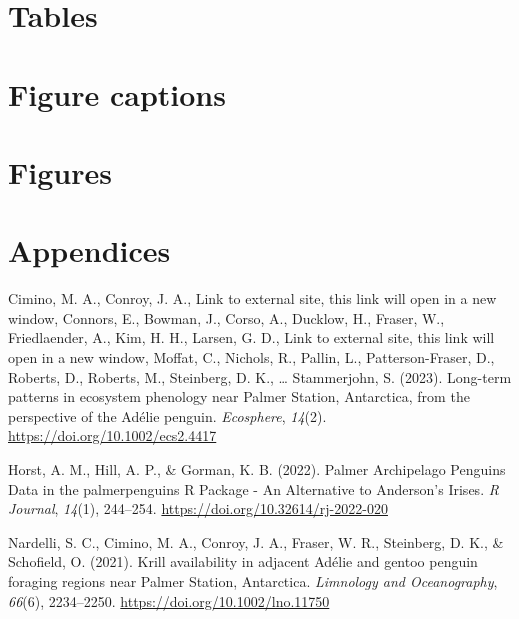 \documentclass[
]{article}
\newlength{\cslhangindent}
\newlength{\cslentryspacingunit} %
\newenvironment{CSLReferences}[2] %
 {%
  \setlength{\parindent}{0pt}
  \ifodd #1
  \let\oldpar\par
  \def\par{\hangindent=\cslhangindent\oldpar}
  \fi
  \setlength{\parskip}{#2\cslentryspacingunit}
 }%
 {}
\begin{document}
\hypertarget{tables}{%
\section{Tables}\label{tables}}

\hypertarget{figure-captions}{%
\section{Figure captions}\label{figure-captions}}

\hypertarget{figures}{%
\section{Figures}\label{figures}}

\hypertarget{appendices}{%
\section*{Appendices}\label{appendices}}

\hypertarget{refs}{}
\begin{CSLReferences}{1}{0}
\leavevmode{}%
Cimino, M. A., Conroy, J. A., Link to external site, this link will open
in a new window, Connors, E., Bowman, J., Corso, A., Ducklow, H.,
Fraser, W., Friedlaender, A., Kim, H. H., Larsen, G. D., Link to
external site, this link will open in a new window, Moffat, C., Nichols,
R., Pallin, L., Patterson-Fraser, D., Roberts, D., Roberts, M.,
Steinberg, D. K., \ldots{} Stammerjohn, S. (2023). Long-term patterns in
ecosystem phenology near {Palmer Station}, {Antarctica}, from the
perspective of the {Adélie} penguin. \emph{Ecosphere}, \emph{14}(2).
\url{https://doi.org/10.1002/ecs2.4417}

\leavevmode{}%
Horst, A. M., Hill, A. P., \& Gorman, K. B. (2022). Palmer {Archipelago
Penguins Data} in the palmerpenguins {R Package} - {An Alternative} to
{Anderson}'s {Irises}. \emph{R Journal}, \emph{14}(1), 244--254.
\url{https://doi.org/10.32614/rj-2022-020}

\leavevmode{}%
Nardelli, S. C., Cimino, M. A., Conroy, J. A., Fraser, W. R., Steinberg,
D. K., \& Schofield, O. (2021). Krill availability in adjacent {Adélie}
and gentoo penguin foraging regions near {Palmer Station}, {Antarctica}.
\emph{Limnology and Oceanography}, \emph{66}(6), 2234--2250.
\url{https://doi.org/10.1002/lno.11750}

\end{CSLReferences}
\end{document}
